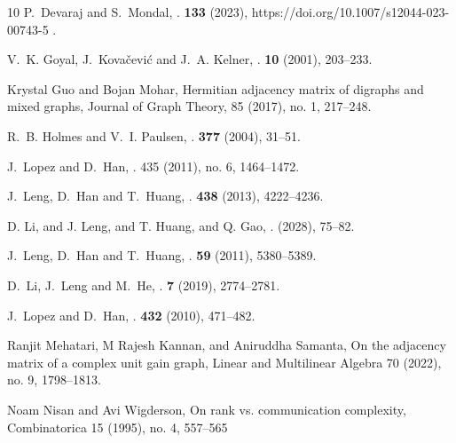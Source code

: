 \documentclass[final,1p,times]{elsarticle}
\begin{document}
\begin{thebibliography}{10}
P.~Devaraj and S.~Mondal,
.
 \textbf{133} (2023), https://doi.org/10.1007/s12044-023-00743-5 .

V.~K. Goyal, J.~Kova{\v{c}}evi{\'c} and J.~A. Kelner,
.
 \textbf{10} (2001), 203--233.


Krystal Guo and Bojan Mohar, Hermitian adjacency matrix of digraphs and mixed graphs, Journal of Graph Theory, 85 (2017), no. 1, 217–248.



R.~B. Holmes and V.~I. Paulsen,
.
 \textbf{377} (2004), 31--51.


J.~Lopez and D.~Han,
.
 435 (2011), no. 6, 1464–1472.

J.~Leng, D.~Han and T.~Huang,
.
 \textbf{438} (2013), 4222--4236.

D. Li,  and J. Leng,  and T. Huang,  and Q. Gao,
.
  (2028), 75--82.

J.~Leng, D.~Han and T.~Huang,
.
 \textbf{59} (2011), 5380--5389.



D.~Li, J.~Leng and M.~He,
.
 \textbf{7} (2019), 2774--2781.


J.~Lopez and D.~Han,
.
 \textbf{432} (2010), 471--482.



 Ranjit Mehatari, M Rajesh Kannan, and Aniruddha Samanta, On the adjacency matrix of a complex unit gain
graph, Linear and Multilinear Algebra 70 (2022), no. 9, 1798–1813.


 Noam Nisan and Avi Wigderson, On rank vs. communication complexity, Combinatorica 15 (1995), no. 4, 557–565


\end{thebibliography}
\end{document}
